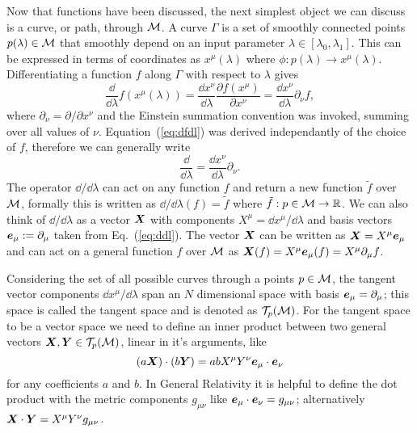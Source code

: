 Now that functions have been discussed, the next simplest object we can discuss is a curve, or path, through $\mathcal{M}$. A curve $\Gamma$ is a set of smoothly connected points $p(\lambda)\in \mathcal{M}$ that smoothly depend on an input parameter $\lambda \in [\lambda_0,\lambda_1]$. This can be expressed in terms of coordinates as $x^\mu(\lambda)$ where $\phi:p(\lambda) \rightarrow x^\mu(\lambda)$. Differentiating a function $f$ along $\Gamma$ with respect to $\lambda$ gives
\begin{equation} \label{eq:dfdl}
\frac{\dd}{\dd \lambda}f(x^\mu(\lambda)) = \frac{\dd x^\nu}{\dd \lambda}\frac{\partial f(x^\mu)}{\partial x^\nu} = \frac{\dd x^\nu}{\dd \lambda}\partial_\nu f,
\end{equation}
where $\partial_\nu = {\partial}/{\partial x^\nu}$ and the Einstein summation convention was invoked, summing over all values of $\nu$. Equation~(\ref{eq:dfdl}) was derived independantly of the choice of $f$, therefore we can generally write
\begin{equation} \label{eq:ddl}
\frac{\dd}{\dd \lambda} = \frac{\dd x^\nu}{\dd \lambda}\partial_\nu.
\end{equation}
The operator $\dd/\dd \lambda $ can act on any function $f$ and return a new function $\tilde{f}$ over $\mathcal{M}$, formally this is written as $\dd/\dd \lambda (f) = \tilde{f}$ where $\tilde{f}:p\in\mathcal{M}\rightarrow \mathbb{R}$. We can also think of $\dd/\dd \lambda$ as a vector $\boldsymbol{X}$ with components $X^\mu=\dd x^\mu / \dd \lambda$ and basis vectors $\boldsymbol{e}_\mu:=\partial_\mu$ taken from Eq.~(\ref{eq:ddl}). The vector $\boldsymbol{X}$ can be written as $\boldsymbol{X} = X^\mu \boldsymbol{e}_\mu$ and can act on a general function $f$ over $\mathcal{M}$ as $\boldsymbol{X}(f) = X^\mu \boldsymbol{e}_\mu(f) = X^\mu \partial_\mu f$. 

Considering the set of all possible curves through a points $p\in\mathcal{M}$, the tangent vector components $\dd x^\mu / \dd \lambda$ span an $N$ dimensional space with basis $\boldsymbol{e}_\mu = \partial_\mu$; this space is called the tangent space and is denoted as $\mathcal{T}_p(\mathcal{M})$. For the tangent space to be a vector space we need to define an inner product between two general vectors $\boldsymbol{X},\boldsymbol{Y} \in \mathcal{T}_p(\mathcal{M})$, linear in it's arguments, like
\begin{equation}
(a\boldsymbol{X})\cdot(b \boldsymbol{Y}) = abX^\mu Y^\nu \boldsymbol{e}_\mu \cdot \boldsymbol{e}_\nu
\end{equation}
for any coefficients $a$ and $b$. In General Relativity it is helpful to define the dot product with the metric components $g_{\mu\nu}$ like $\boldsymbol{e}_\mu \cdot \boldsymbol{e}_\nu = g_{\mu\nu}$; alternatively $\boldsymbol{X} \cdot \boldsymbol{Y} = X^\mu Y^\nu g_{\mu\nu}$.

